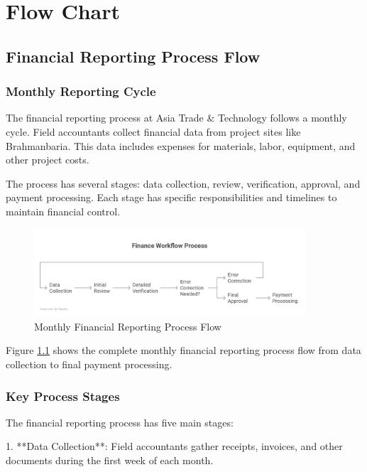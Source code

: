 
\chapter{Flow Chart}

\section{Financial Reporting Process Flow}

\subsection{Monthly Reporting Cycle}
The financial reporting process at Asia Trade \& Technology follows a monthly cycle. Field accountants collect financial data from project sites like Brahmanbaria. This data includes expenses for materials, labor, equipment, and other project costs.

The process has several stages: data collection, review, verification, approval, and payment processing. Each stage has specific responsibilities and timelines to maintain financial control.

\vspace{0.5em}
\begin{figure}[H]
    \centering
    \includegraphics[width=0.9\textwidth]{assets/images/financial_flowchart.png}
    \caption{Monthly Financial Reporting Process Flow}
    \label{fig:financial_flowchart}
\end{figure}

Figure \ref{fig:financial_flowchart} shows the complete monthly financial reporting process flow from data collection to final payment processing.

\subsection{Key Process Stages}
The financial reporting process has five main stages:

1. **Data Collection**: Field accountants gather receipts, invoices, and other documents during the first week of each month.

